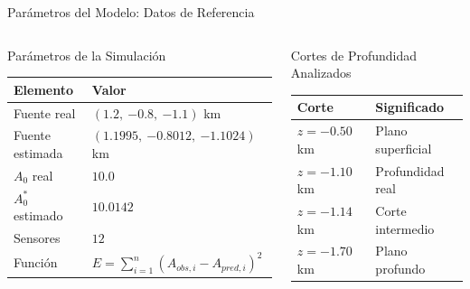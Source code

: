 

\begin{frame}{Parámetros del Modelo: Datos de Referencia}

    \begin{columns}[T]


        \vspace{-0.7cm}

        \begin{block}{Parámetros de la Simulación}
            \centering
            \scriptsize
            \begin{tabular}{@{}lp{2.8cm}@{}}
                \toprule
                \textbf{Elemento} & \textbf{Valor} \\ \midrule
                Fuente real & $(1.2,\ {-0.8},\ {-1.1})$ km \\[0.04cm]
                Fuente estimada & $(1.1995,\ {-0.8012},\ {-1.1024})$ km \\[0.04cm]
                $A_0$ real & $10.0$ \\[0.04cm]
                $A_0^*$ estimado & $10.0142$ \\[0.04cm]
                Sensores & $12$ \\[0.04cm]
                Función & $E = \sum_{i=1}^{n}(A_{obs,i} - A_{pred,i})^2$ \\
                \bottomrule
            \end{tabular}
        \end{block}

        \vspace{-0.50cm}

        \begin{exampleblock}{Cortes de Profundidad Analizados}
            \centering
            \scriptsize
            \begin{tabular}{@{}lp{2.8cm}@{}}
                \toprule
                \textbf{Corte} & \textbf{Significado} \\ \midrule
                $z = -0.50$ km & Plano superficial \\
                $z = -1.10$ km & Profundidad real \\
                $z = -1.14$ km & Corte intermedio \\
                $z = -1.70$ km & Plano profundo \\
                \bottomrule
            \end{tabular}
        \end{exampleblock}


\end{columns}
\end{frame}
